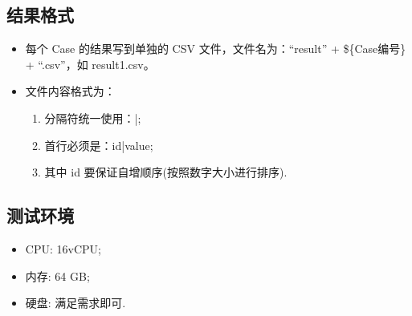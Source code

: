 \subsection{结果格式}
\begin{itemize}
  \item 每个 Case 的结果写到单独的 CSV 文件，文件名为：``result'' + \$\{Case编号\} +
    ``.csv''，如 result1.csv。
  \item 文件内容格式为：
    \begin{enumerate}
      \item 分隔符统一使用：|;
      \item 首行必须是：id|value;
      \item 其中 id 要保证自增顺序(按照数字大小进行排序).
    \end{enumerate}
\end{itemize}

\subsection{测试环境}
\begin{itemize}
  \item CPU: 16vCPU;
  \item 内存: 64 GB;
  \item 硬盘: 满足需求即可.
\end{itemize}
